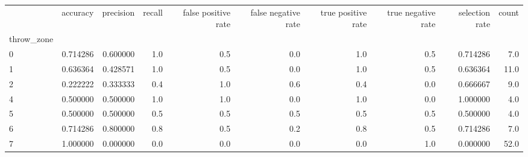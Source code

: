 \begin{tabular}{lrrrrrrrrr}
\toprule
{} &  accuracy &  precision &  recall &  false positive rate &  false negative rate &  true positive rate &  true negative rate &  selection rate &  count \\
throw\_zone &           &            &         &                      &                      &                     &                     &                 &        \\
\midrule
0          &  0.714286 &   0.600000 &     1.0 &                  0.5 &                  0.0 &                 1.0 &                 0.5 &        0.714286 &    7.0 \\
1          &  0.636364 &   0.428571 &     1.0 &                  0.5 &                  0.0 &                 1.0 &                 0.5 &        0.636364 &   11.0 \\
2          &  0.222222 &   0.333333 &     0.4 &                  1.0 &                  0.6 &                 0.4 &                 0.0 &        0.666667 &    9.0 \\
4          &  0.500000 &   0.500000 &     1.0 &                  1.0 &                  0.0 &                 1.0 &                 0.0 &        1.000000 &    4.0 \\
5          &  0.500000 &   0.500000 &     0.5 &                  0.5 &                  0.5 &                 0.5 &                 0.5 &        0.500000 &    4.0 \\
6          &  0.714286 &   0.800000 &     0.8 &                  0.5 &                  0.2 &                 0.8 &                 0.5 &        0.714286 &    7.0 \\
7          &  1.000000 &   0.000000 &     0.0 &                  0.0 &                  0.0 &                 0.0 &                 1.0 &        0.000000 &   52.0 \\
\bottomrule
\end{tabular}
